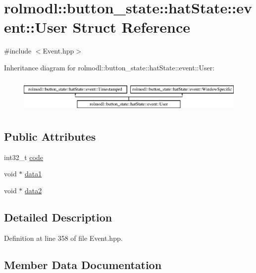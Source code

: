 \hypertarget{structrolmodl_1_1button__state_1_1hat_state_1_1event_1_1_user}{}\section{rolmodl\+::button\+\_\+state\+::hat\+State\+::event\+::User Struct Reference}
\label{structrolmodl_1_1button__state_1_1hat_state_1_1event_1_1_user}


{\ttfamily \#include $<$Event.\+hpp$>$}

Inheritance diagram for rolmodl\+::button\+\_\+state\+::hat\+State\+::event\+::User\+:\begin{figure}[H]
\begin{center}
\leavevmode
\includegraphics[height=1.761006cm]{structrolmodl_1_1button__state_1_1hat_state_1_1event_1_1_user}
\end{center}
\end{figure}
\subsection*{Public Attributes}
\begin{DoxyCompactItemize}
\item 
int32\+\_\+t \mbox{\hyperlink{structrolmodl_1_1button__state_1_1hat_state_1_1event_1_1_user_a335563a9c49778eca83a708cc496144f}{code}}
\item 
void $\ast$ \mbox{\hyperlink{structrolmodl_1_1button__state_1_1hat_state_1_1event_1_1_user_a46245919037d02ddaedf718515dda29d}{data1}}
\item 
void $\ast$ \mbox{\hyperlink{structrolmodl_1_1button__state_1_1hat_state_1_1event_1_1_user_a5bd205ed153ce3aababdbc93bef8ed8d}{data2}}
\end{DoxyCompactItemize}


\subsection{Detailed Description}


Definition at line 358 of file Event.\+hpp.



\subsection{Member Data Documentation}
\mbox{\label{structrolmodl_1_1button__state_1_1hat_state_1_1event_1_1_user_a335563a9c49778eca83a708cc496144f}} 
